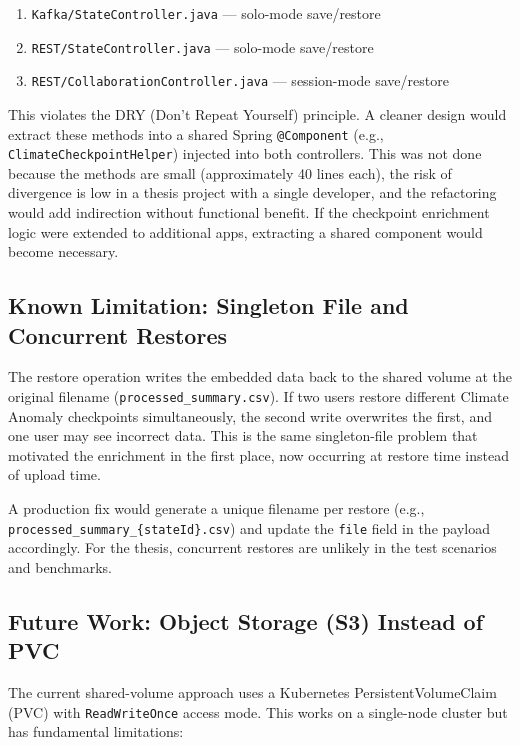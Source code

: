 \documentclass[11pt,a4paper]{article}
\begin{document}
\begin{enumerate}[nosep]
  \item \texttt{Kafka/StateController.java} --- solo-mode save/restore
  \item \texttt{REST/StateController.java} --- solo-mode save/restore
  \item \texttt{REST/CollaborationController.java} --- session-mode save/restore
\end{enumerate}

This violates the DRY (Don't Repeat Yourself) principle. A cleaner design would
extract these methods into a shared Spring \texttt{@Component} (e.g.,
\texttt{ClimateCheckpointHelper}) injected into both controllers. This was not
done because the methods are small (approximately 40 lines each), the risk of
divergence is low in a thesis project with a single developer, and the
refactoring would add indirection without functional benefit. If the checkpoint
enrichment logic were extended to additional apps, extracting a shared component
would become necessary.

\subsection{Known Limitation: Singleton File and Concurrent Restores}

The restore operation writes the embedded data back to the shared volume at the
original filename (\texttt{processed\_summary.csv}). If two users restore
different Climate Anomaly checkpoints simultaneously, the second write
overwrites the first, and one user may see incorrect data. This is the same
singleton-file problem that motivated the enrichment in the first place, now
occurring at restore time instead of upload time.

A production fix would generate a unique filename per restore (e.g.,
\texttt{processed\_summary\_\{stateId\}.csv}) and update the \texttt{file}
field in the payload accordingly. For the thesis, concurrent restores are
unlikely in the test scenarios and benchmarks.

\subsection{Future Work: Object Storage (S3) Instead of PVC}

The current shared-volume approach uses a Kubernetes PersistentVolumeClaim (PVC)
with \texttt{ReadWriteOnce} access mode. This works on a single-node cluster
but has fundamental limitations:
\end{document}
